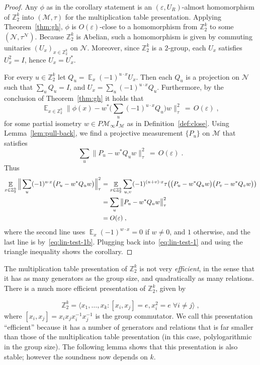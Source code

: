 \documentclass[11pt]{article}
\theoremstyle{definition}
\newcommand{\Id}{\ensuremath{I}}
\DeclareMathOperator*{\Expectation}{\mathbb{E}}
\newcommand{\Es}[1]{\Expectation_{#1}}
\newcommand{\Z}{\ensuremath{\mathbb{Z}}}
\newcommand{\mM}{\ensuremath{\mathcal{M}}}
\newcommand{\eps}{\varepsilon}
\newcommand{\mN}{\mathcal{N}}
\begin{document}
\begin{proof}
Any $\phi$ as in the corollary statement is an $(\eps,U_R)$-almost homomorphism of $\Z_2^k$ into $(\mM,\tau)$ for the multiplication table presentation. Applying Theorem~\ref{thm:gh}, $\phi$ is $O(\eps)$-close to a homomorphism from $\Z_2^k$ to some $(\mN,\tau^\mN)$. Because $\Z_2^k$ is Abelian, such a homomorphism is given by commuting unitaries $(U_x)_{x\in\Z_2^k}$ on $\mN$. Moreover, since $\Z_2^k$ is a $2$-group, each $U_x$ satisfies $U_x^2=\Id$, hence $U_x=U_x^*$.

For every $u\in  \Z_2^k$ let $Q_u = \Es{x} (-1)^{u\cdot x} U_x$. Then each $Q_u$ is a projection on $\mN$ such that $\sum_u Q_u=\Id$, and $U_x = \sum_u (-1)^{u\cdot x} Q_u$. Furthermore, by the conclusion of Theorem~\ref{thm:gh} it holds that 
\begin{equation}\label{eq:lin-test-1}
   \Es{x\in \Z_2^k} \Big\| \phi(x) - w^*\Big(\sum_u (-1)^{u\cdot x} Q_u\Big)w  \Big\|_{\tau}^2 \,=\, O(\eps)\;,
\end{equation}
for some partial isometry $w\in P\mM_\infty I_\mM$ as in Definition~\ref{def:close}.
Using Lemma~\ref{lem:pull-back}, we find a projective measurement $\{P_u\}$ on $\mM$ that satisfies 
\begin{equation}\label{eq:lin-test-1b}
 \sum_u \big\| P_u - w^* Q_u w \big\|_\tau^2 \,=\, O(\eps)\;.
\end{equation}
Thus
\begin{align}
\Es{x\in \Z_2^k}  \Big\| \sum_u (-1)^{u\cdot x} \big(P_u - w^* Q_u w\big) \Big\|_\tau^2
&=\Es{x\in \Z_2^k} \sum_{u,v} (-1)^{(u+v)\cdot x} \tau\big(\big(P_u - w^* Q_u w\big)\big(P_v - w^* Q_v w\big)\big) \notag\\
&= \sum_u \big\| P_u - w^* Q_u w\big\|_\tau^2\notag\\
&= O(\eps)\;,\label{eq:lin-test-2}
\end{align}
where the second line uses $\Es{x} (-1)^{w\cdot x} = 0$ if $w\neq 0$, and $1$ otherwise, and the last line is by~\eqref{eq:lin-test-1b}. Plugging back into~\eqref{eq:lin-test-1} and using the triangle inequality shows the corollary.  
\end{proof}

The multiplication table presentation of $\Z_2^k$ is not very \emph{efficient}, in the sense that it has as many generators as the group size, and quadratically as many relations. There is a much more efficient presentation of $\Z_2^k$, given by

\begin{equation}\label{eq:z2-efficient}
 \Z_2^k = \langle x_1,\ldots,x_k : [x_i,x_j]=e, x_i^2=e \; \forall i\neq j \rangle\;,
\end{equation}
where $[x_i,x_j]=x_ix_jx_i^{-1}x_j^{-1}$ is the group commutator. 
We call this presentation ``efficient'' because it has a number of generators and relations that is far smaller than those of the multiplication table presentation (in this case, polylogarithmic in the group size). The following lemma shows that this presentation is also stable; however the soundness now depends on $k$. 
\end{document}

